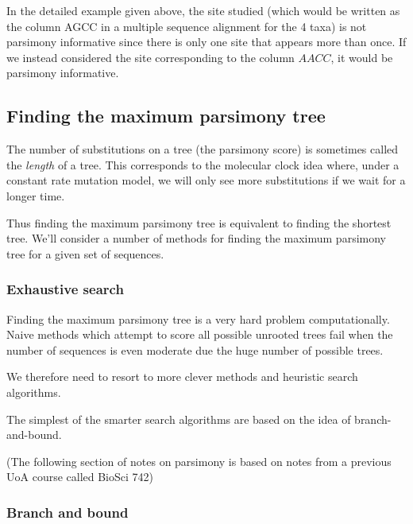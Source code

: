 \documentclass[11pt]{article}
\begin{document}
In the detailed example given above, the site studied (which would be written as the column AGCC in a multiple sequence alignment for the 4 taxa) is not parsimony informative since there is only one site that appears more than once.    If we instead considered the site corresponding to the column $AACC$, it would be parsimony informative.
 


\subsection{Finding the maximum parsimony  tree}

The number of substitutions on a tree (the parsimony score) is sometimes called the {\em length}  of a tree.  This corresponds to the molecular clock idea where, under a constant rate mutation model, we will only see more substitutions if we wait for a longer time.  

Thus finding the maximum parsimony tree is equivalent to finding the shortest tree.  We'll consider a number of methods for finding the maximum parsimony tree for a given set of sequences.


\subsubsection{Exhaustive search}

Finding the maximum parsimony tree is a very hard problem computationally.  Naive methods which attempt to score all possible unrooted trees fail when the number of sequences is even moderate due the huge number of possible trees. 



We therefore need to resort to more clever methods and heuristic  search algorithms.  

 The simplest of the smarter search algorithms are based on the idea of branch-and-bound. %





(The following section of notes on parsimony is based on notes from a previous UoA course called BioSci 742)

\subsubsection{Branch and bound}
\end{document}
